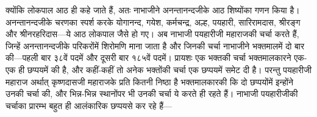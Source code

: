 \begin{sloppypar}\justifying{}
क्योंकि लोकपाल आठ ही कहे जाते हैं, अतः नाभाजीने अनन्तानन्दजीके आठ शिष्योंका गणन किया है। अनन्तानन्दजीके चरणका स्पर्श करके योगानन्द, गयेश, कर्मचन्द्र, अल्ह, पयहारी, सारिरामदास, श्रीरङ्ग और श्रीनरहरिदास—ये आठ लोकपाल जैसे हो गए। अब नाभाजी पयहारीजी महाराजकी चर्चा करते हैं, जिन्हें अनन्तानन्दजीके परिकरोंमें शिरोमणि माना जाता है और जिनकी चर्चा नाभाजीने भक्तमालमें दो बार की—पहली बार ३८वें पदमें और दूसरी बार १८५वें पदमें। प्रायशः एक भक्तकी चर्चा भक्तमालकारने एक-एक ही छप्पयमें की है, और कहीं-कहीं तो अनेक भक्तोंकी चर्चा एक छप्पयमें समेट दी है। परन्तु पयहारीजी महाराज अर्थात् कृष्णदासजी महाराजके प्रति कितनी निष्ठा है भक्तमालकारकी कि दो छप्पयोंमें इन्होंने उनकी चर्चा की, और भिन्न-भिन्न स्थानोंपर भी उनकी चर्चा ये करते ही रहते हैं। नाभाजी पयहारीजीकी चर्चाका प्रारम्भ बहुत ही आलंकारिक छप्पयसे कर रहे हैं—
\end{sloppypar}


